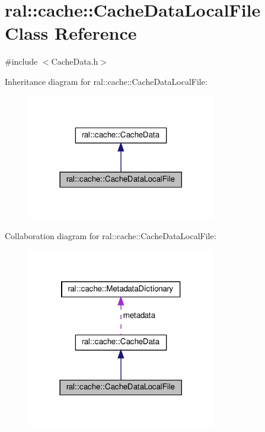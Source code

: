 \hypertarget{classral_1_1cache_1_1CacheDataLocalFile}{}\section{ral\+:\+:cache\+:\+:Cache\+Data\+Local\+File Class Reference}
\label{classral_1_1cache_1_1CacheDataLocalFile}


{\ttfamily \#include $<$Cache\+Data.\+h$>$}



Inheritance diagram for ral\+:\+:cache\+:\+:Cache\+Data\+Local\+File\+:\nopagebreak
\begin{figure}[H]
\begin{center}
\leavevmode
\includegraphics[width=234pt]{classral_1_1cache_1_1CacheDataLocalFile__inherit__graph}
\end{center}
\end{figure}


Collaboration diagram for ral\+:\+:cache\+:\+:Cache\+Data\+Local\+File\+:\nopagebreak
\begin{figure}[H]
\begin{center}
\leavevmode
\includegraphics[width=234pt]{classral_1_1cache_1_1CacheDataLocalFile__coll__graph}
\end{center}
\end{figure}
